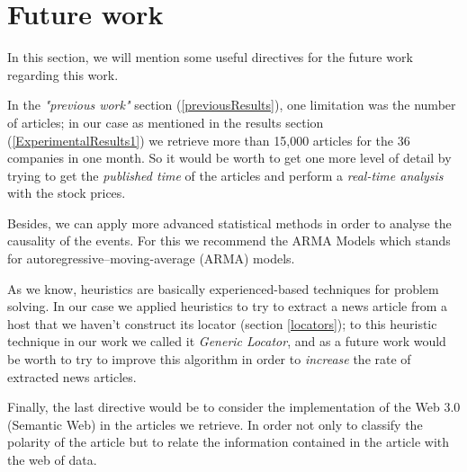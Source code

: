 \section{Future work}

In this section, we will mention some useful directives for the future work regarding this work. 

In the \emph{"previous work"} section (\ref{previousResults}), one limitation was the number of articles; in our case as mentioned in the results section (\ref{ExperimentalResults1}) we retrieve more than 15,000 articles for the 36 companies in one month. So it would be worth to get one more level of detail by trying to get the \emph{published time} of the articles and perform a \emph{real-time analysis} with the stock prices.

Besides, we can apply more advanced statistical methods in order to analyse the causality of the events. For this we recommend the ARMA Models which stands for autoregressive–moving-average (ARMA) models.

As we know, heuristics are basically experienced-based techniques for problem solving. In our case we applied heuristics to try to extract a news article from a host that we haven't construct its locator (section \ref{locators}); to this heuristic technique in our work we called it \emph{Generic Locator}, and as a future work would be worth to try to improve this algorithm in order to \emph{increase} the rate of extracted news articles.

Finally, the last directive would be to consider the implementation of the Web 3.0 (Semantic Web) in the articles we retrieve. In order not only to classify the polarity of the article but to relate the information contained in the article with the web of data.